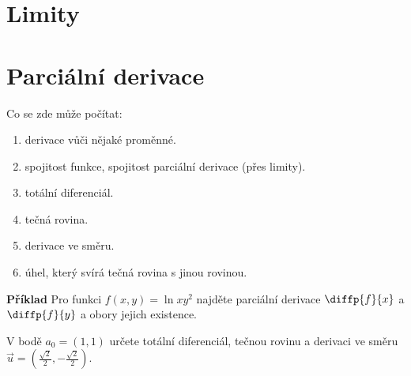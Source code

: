 \documentclass{article}
\begin{document}
\section{Limity}


\newpage
\section{Parciální derivace}

Co se zde může počítat: 
\begin{enumerate}
    \item derivace vůči nějaké proměnné.
    \item spojitost funkce, spojitost parciální derivace (přes limity).
    \item totální diferenciál.
    \item tečná rovina.
    \item derivace ve směru.
    \item úhel, který svírá tečná rovina s jinou rovinou.
\end{enumerate}
\textbf{Příklad} Pro funkci $f(x, y) = \ln{x y^2}$ najděte parciální derivace $\diffp{f}{x}$ a $\diffp{f}{y}$ a obory jejich existence.

    V bodě $a_0 = (1, 1)$ určete totální diferenciál, tečnou rovinu a derivaci ve směru $\vec{u} = (\frac{\sqrt{2}}{2}, -\frac{\sqrt{2}}{2})$.
\end{document}
